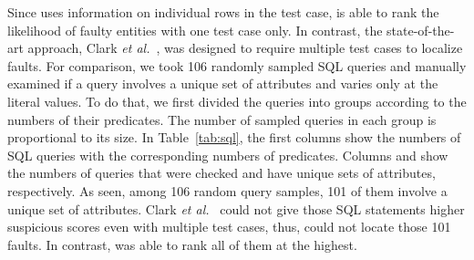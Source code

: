 \vspace{0.05in}
Since \tool{} uses information on individual rows in the test case,
\tool{} is able to rank the likelihood of faulty entities with one
test case only. In contrast, the state-of-the-art approach, Clark {\em
et al.}~\cite{ga-ase11}, was designed to require multiple test cases
to localize faults. For comparison, we took 106 randomly sampled SQL
queries and manually examined if a query involves a unique set of
attributes and varies only at the literal values. To do that, we first
divided the queries into groups according to the numbers of their
predicates. The number of sampled queries in each group is
proportional to its size. In Table~\ref{tab:sql}, the first columns
show the numbers of SQL queries with the corresponding numbers of
predicates. Columns  and  show the numbers
of queries that were checked and have unique sets of attributes,
respectively. As seen, among 106 random query samples, 101 of them
involve a unique set of attributes. Clark {\em et al.}~\cite{ga-ase11}
could not give those SQL statements higher suspicious scores even with
multiple test cases, thus, could not locate those 101 faults. In
contrast, {\tool} was able to rank all of them at the highest.
